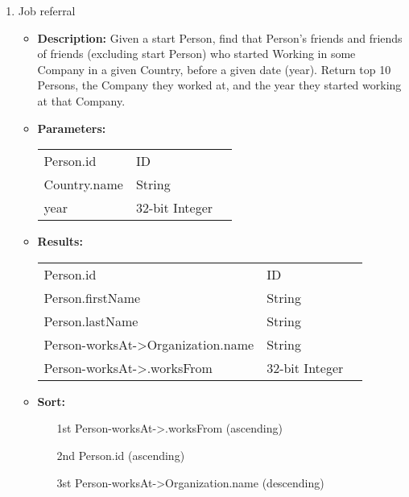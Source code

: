 {\begin{enumerate}
    \item Job referral
        \begin{itemize}
            \item \textbf{Description:}
                Given a start Person, find that Person's friends and friends of
                friends (excluding start Person) who started Working in some
                Company in a given Country, before a given date (year).  Return top
                10 Persons, the Company they worked at, and the year they started
                working at that Company.  
            \item \textbf{Parameters:} \\
                \begin{tabular}{lll}
                    Person.id 	 				& ID & \parbox[t]{20cm}{\par \strut} \\
                    Country.name 	 			& String & \parbox[t]{20cm}{\par \strut} \\
                    year 		 				& 32-bit Integer & \parbox[t]{20cm}{\par \strut} \\
                \end{tabular}		
            \item \textbf{Results:} \\
                \begin{tabular}{lll}
                    Person.id 	 						& ID & \parbox[t]{20cm}{\par \strut} \\
                    Person.firstName 	 				& String & \parbox[t]{20cm}{\par \strut} \\
                    Person.lastName 	 				& String & \parbox[t]{20cm}{\par \strut} \\
                    Person-worksAt->Organization.name 	& String & \parbox[t]{20cm}{\par \strut} \\
                    Person-worksAt->.worksFrom 	 		& 32-bit Integer & \parbox[t]{20cm}{\par \strut} \\
                \end{tabular}		
            \item \textbf{Sort:}
                  \begin{itemize}
                    \item[1st] Person-worksAt->.worksFrom (ascending)
                    \item[2nd] Person.id (ascending)
                    \item[3st] Person-worksAt->Organization.name (descending)
                  \end{itemize}
        \end{itemize}


\end{enumerate}}
